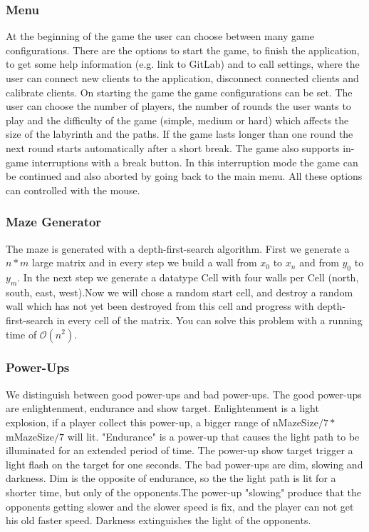 \documentclass{sigchi}
\begin{document}
\subsubsection{Menu}
At the beginning of the game the user can choose between many game configurations. There are the options to start the game, to finish the application, to get some help information (e.g. link to GitLab) and to call settings, where the user can connect new clients to the application, disconnect connected clients and calibrate clients. On starting the game the game configurations can be set. The user can choose the number of players, the number of rounds the user wants to play and the difficulty of the game (simple, medium or hard) which affects the size of the labyrinth and the paths. If the game lasts longer than one round the next round starts automatically after a short break. The game also supports in-game interruptions with a break button. In this interruption mode the game can be continued and also aborted by going back to the main menu. All these options can controlled with the mouse.
\subsubsection{Maze Generator} 
The maze is generated with a depth-first-search algorithm. First we generate a $n*m$ large matrix and in every step we build a wall from $x_{0}$ to $x_{n}$ and from $y_{0}$ to $y_{m}$. In the next step we generate a datatype Cell with four walls per Cell (north, south, east, west).Now we will chose a random start cell, and destroy a random wall which has not yet been destroyed from this cell and progress with depth-first-search in every cell of the matrix. You can solve this problem with a running time of $\mathcal{O}(n^2)$.
\subsubsection{Power-Ups} 
We distinguish between good power-ups and bad power-ups. The good power-ups are enlightenment, endurance and show target. Enlightenment is a light explosion, if a player collect this power-up, a bigger range of nMazeSize$/7 *\;$ mMazeSize$/7$ will lit. "Endurance" is a power-up that causes the light path to be illuminated for an extended period of time. The power-up show target trigger a light flash on the target for one seconds. The bad power-ups are dim, slowing and darkness. Dim is the opposite of endurance, so the the light path is lit for a shorter time, but only of the opponents.The power-up "slowing" produce that the opponents getting slower and the slower speed is fix, and the player can not get his old faster speed. Darkness extinguishes the light of the opponents. 
\end{document}
